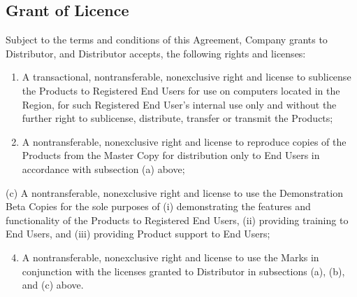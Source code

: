 \documentclass[letterpaper,10pt,english]{sphinxmanual}
\begin{document}
\subsection{Grant of Licence}
\label{\detokenize{grantlicence:grant-of-licence}}
Subject to the terms and conditions of this Agreement, Company grants to Distributor, and Distributor accepts, the following rights and licenses:
\begin{enumerate}
\item {} 
A transactional, nontransferable, nonexclusive right and license to sublicense the Products to Registered End Users for use on computers located in the Region, for such Registered End User’s internal use only and without the further right to sublicense, distribute, transfer or transmit the Products;

\item {} 
A nontransferable, nonexclusive right and license to reproduce copies of the Products from the Master Copy for distribution only to End Users in accordance with subsection (a) above;

\end{enumerate}

(c)     A nontransferable, nonexclusive right and license to use the Demonstration Beta
Copies for the sole purposes of (i) demonstrating the features and functionality of the Products to Registered End Users, (ii) providing training to End Users, and (iii) providing Product support to
End Users;
\begin{enumerate}
\setcounter{enumi}{3}
\item {} 
A nontransferable, nonexclusive right and license to use the Marks in conjunction with the licenses granted to Distributor in subsections (a), (b), and (c) above.

\end{enumerate}
\end{document}
